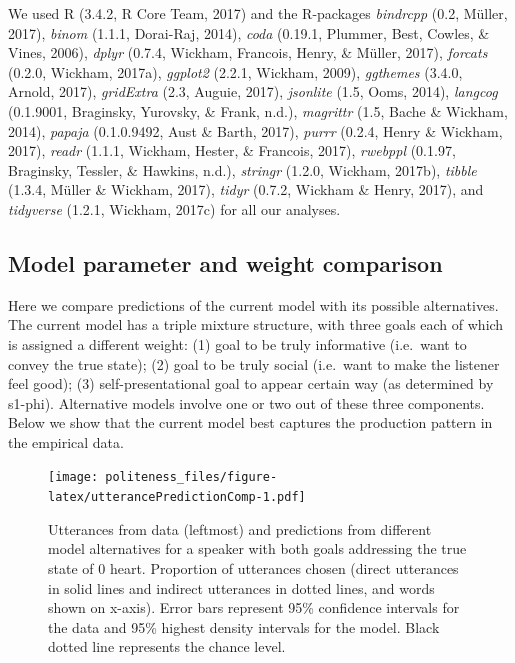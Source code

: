 \documentclass[english,floatsintext,man]{apa6}
\theoremstyle{definition}
\theoremstyle{definition}
\theoremstyle{definition}
\theoremstyle{remark}
\begin{document}
We used R (3.4.2, R Core Team, 2017) and the R-packages \emph{bindrcpp}
(0.2, Müller, 2017), \emph{binom} (1.1.1, Dorai-Raj, 2014), \emph{coda}
(0.19.1, Plummer, Best, Cowles, \& Vines, 2006), \emph{dplyr} (0.7.4,
Wickham, Francois, Henry, \& Müller, 2017), \emph{forcats} (0.2.0,
Wickham, 2017a), \emph{ggplot2} (2.2.1, Wickham, 2009), \emph{ggthemes}
(3.4.0, Arnold, 2017), \emph{gridExtra} (2.3, Auguie, 2017),
\emph{jsonlite} (1.5, Ooms, 2014), \emph{langcog} (0.1.9001, Braginsky,
Yurovsky, \& Frank, n.d.), \emph{magrittr} (1.5, Bache \& Wickham,
2014), \emph{papaja} (0.1.0.9492, Aust \& Barth, 2017), \emph{purrr}
(0.2.4, Henry \& Wickham, 2017), \emph{readr} (1.1.1, Wickham, Hester,
\& Francois, 2017), \emph{rwebppl} (0.1.97, Braginsky, Tessler, \&
Hawkins, n.d.), \emph{stringr} (1.2.0, Wickham, 2017b), \emph{tibble}
(1.3.4, Müller \& Wickham, 2017), \emph{tidyr} (0.7.2, Wickham \& Henry,
2017), and \emph{tidyverse} (1.2.1, Wickham, 2017c) for all our
analyses.

\hypertarget{model-parameter-and-weight-comparison}{%
\subsection{Model parameter and weight
comparison}\label{model-parameter-and-weight-comparison}}

Here we compare predictions of the current model with its possible
alternatives. The current model has a triple mixture structure, with
three goals each of which is assigned a different weight: (1) goal to be
truly informative (i.e.~want to convey the true state); (2) goal to be
truly social (i.e.~want to make the listener feel good); (3)
self-presentational goal to appear certain way (as determined by
s1-phi). Alternative models involve one or two out of these three
components. Below we show that the current model best captures the
production pattern in the empirical data.

\begin{figure}
\centering
\texttt{[image: politeness\_files/figure-latex/utterancePredictionComp-1.pdf]}
\caption{\label{fig:utterancePredictionComp}Utterances from data (leftmost)
and predictions from different model alternatives for a speaker with
both goals addressing the true state of 0 heart. Proportion of
utterances chosen (direct utterances in solid lines and indirect
utterances in dotted lines, and words shown on x-axis). Error bars
represent 95\% confidence intervals for the data and 95\% highest
density intervals for the model. Black dotted line represents the chance
level.}
\end{figure}
\end{document}
